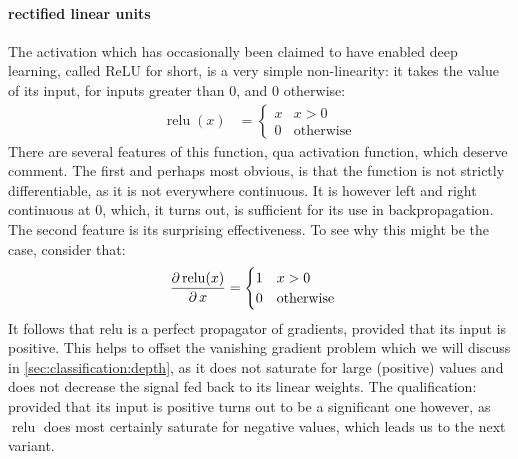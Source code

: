 \documentclass[msc]{infthesis}
\newcommand{\relu}{\operatorname{relu}}
\begin{document}
\paragraph*{rectified linear units}
%
The activation which has occasionally been claimed to have enabled deep learning, called ReLU
for short, is a very simple non-linearity: it takes the value of its input, for inputs greater
than 0, and 0 otherwise:
%
\begin{align}
  \label{eq:relu}
  \relu( x ) &=
    \begin{cases}
      x & x > 0 \\
      0 & \text{otherwise}
    \end{cases}
\end{align}
%
There are several features of this function, qua activation function, which deserve comment.  The
first and perhaps most obvious, is that the function is not strictly differentiable, as it is not
everywhere continuous.  It is however left and right continuous at 0, which, it turns out, is
sufficient for its use in backpropagation.
%
The second feature is its surprising effectiveness.  To see why this might be the case, consider
that:
\begin{align}
\label{eq:relu-derivative}
\derivative[\relu(x)]{x} &= 
    \begin{cases}
      1 & x > 0 \\
      0 & \text{otherwise}
    \end{cases}
\end{align}
%
It follows that relu is a perfect propagator of gradients, provided that its input is positive.
This helps to offset the vanishing gradient problem which we will discuss in
\ref{sec:classification:depth}, as it does not saturate for large (positive) values and does not
decrease the signal fed back to its linear weights.  The qualification: provided that its input
is positive turns out to be a significant one however, as \(\relu\) does most certainly saturate
for negative values, which leads us to the next variant.
\end{document}
